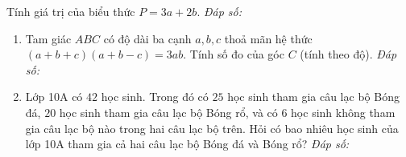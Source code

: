 \documentclass[12pt,a4paper]{article}
\newcommand{\answerbox}{\hfill\textit{Đáp số:}\ \fbox{\rule{0pt}{9pt}\hspace{2.2cm}}}
\begin{document}
\begin{enumerate}
\begin{center}
\vspace{-6pt}
\end{center}

Tính giá trị của biểu thức $P = 3a + 2b$.
\answerbox
\end{enumerate}
\newpage

\begin{enumerate}[resume]
\item Tam giác $ABC$ có độ dài ba cạnh $a, b, c$ thoả mãn hệ thức $(a + b + c)(a + b - c) = 3ab$. Tính số đo của góc $C$ (tính theo độ).
\answerbox

\item Lớp 10A có $42$ học sinh. Trong đó có $25$ học sinh tham gia câu lạc bộ Bóng đá, $20$ học sinh tham gia câu lạc bộ Bóng rổ, và có $6$ học sinh không tham gia câu lạc bộ nào trong hai câu lạc bộ trên. Hỏi có bao nhiêu học sinh của lớp 10A tham gia cả hai câu lạc bộ Bóng đá và Bóng rổ?
\answerbox
\end{enumerate}
\end{document}

